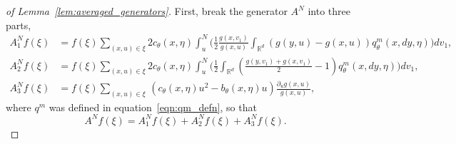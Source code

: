 \documentclass[EJP]{ejpecp} %
\newcommand{\IR}{\mathbb R}
\newcommand{\lp}{\xi}              %
\begin{document}
\begin{proof}[of Lemma~\ref{lem:averaged_generators}]
First, break the generator $A^N$ into three parts, 
\begin{align*}
    A^N_1f(\lp)
    &=
    f(\lp) \sum_{(x,u)\in\lp} 2 c_\theta(x,\eta)
    \int_u^{N}\Bigg(
        \frac{1}{2}\frac{g(x,v_1)}{g(x,u)}
        \int_{\IR^d} (g(y,u)-g(x,u))q^m_{\theta}(x,dy,\eta)
    \Bigg)dv_1 ,
    \\
    A^N_2f(\lp)
    &=
    f(\lp) \sum_{(x,u)\in\lp} 2 c_\theta(x,\eta)
    \int_u^{N}\Bigg(
        \frac{1}{2}\int_{\IR^d}
            \left(\frac{g(y,v_1) + g(x,v_1)}{2} - 1\right)
        q^m_{\theta}(x,dy,\eta)
    \Bigg)dv_1 ,
    \\
    A^N_3f(\lp)
    &=
    f(\lp) \sum_{(x,u)\in\lp}\,
    \left( c_\theta(x,\eta) u^2 - b_{\theta}(x,\eta)u \right) \frac{\partial_u g(x,u)}{g(x,u)},
\end{align*}
where $q^m$ was defined in equation~\eqref{eqn:qm_defn},
so that 
$$ A^Nf(\lp) = A^N_1f(\lp) + A^N_2f(\lp) + A^N_3f(\lp). $$


\end{proof}
\end{document}
